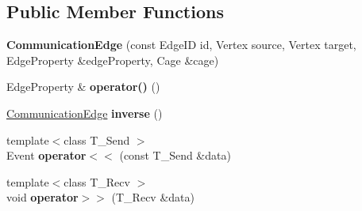 \subsection*{Public Member Functions}
\begin{DoxyCompactItemize}
\item 
\hypertarget{structCommunicationEdge_a879b382e8fc2016bed9c6bbe01ba8621}{}{\bfseries Communication\+Edge} (const Edge\+I\+D id, Vertex source, Vertex target, Edge\+Property \&edge\+Property, Cage \&cage)\label{structCommunicationEdge_a879b382e8fc2016bed9c6bbe01ba8621}

\item 
\hypertarget{structCommunicationEdge_a8c9f3d7707c1a75ceb6b94574107255b}{}Edge\+Property \& {\bfseries operator()} ()\label{structCommunicationEdge_a8c9f3d7707c1a75ceb6b94574107255b}

\item 
\hypertarget{structCommunicationEdge_ad819c876d8b31aafe53fc5cda6ed3dfe}{}\hyperlink{structCommunicationEdge}{Communication\+Edge} {\bfseries inverse} ()\label{structCommunicationEdge_ad819c876d8b31aafe53fc5cda6ed3dfe}

\item 
\hypertarget{structCommunicationEdge_a73b168905fdaf4d6041f056cbe823d60}{}{\footnotesize template$<$class T\+\_\+\+Send $>$ }\\Event {\bfseries operator$<$$<$} (const T\+\_\+\+Send \&data)\label{structCommunicationEdge_a73b168905fdaf4d6041f056cbe823d60}

\item 
\hypertarget{structCommunicationEdge_abcef7bf64ae74d3c8a0f17ed56c35bdc}{}{\footnotesize template$<$class T\+\_\+\+Recv $>$ }\\void {\bfseries operator$>$$>$} (T\+\_\+\+Recv \&data)\label{structCommunicationEdge_abcef7bf64ae74d3c8a0f17ed56c35bdc}

\end{DoxyCompactItemize}
